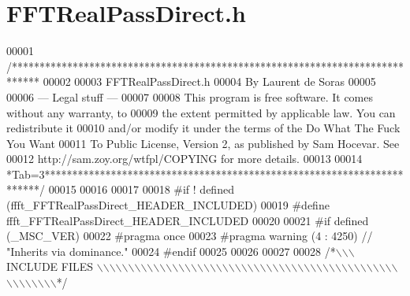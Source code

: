 \hypertarget{a00100_source}{\section{F\+F\+T\+Real\+Pass\+Direct.\+h}
\label{a00100_source}
}

\begin{DoxyCode}
00001 \textcolor{comment}{/*****************************************************************************}
00002 \textcolor{comment}{}
00003 \textcolor{comment}{        FFTRealPassDirect.h}
00004 \textcolor{comment}{        By Laurent de Soras}
00005 \textcolor{comment}{}
00006 \textcolor{comment}{--- Legal stuff ---}
00007 \textcolor{comment}{}
00008 \textcolor{comment}{This program is free software. It comes without any warranty, to}
00009 \textcolor{comment}{the extent permitted by applicable law. You can redistribute it}
00010 \textcolor{comment}{and/or modify it under the terms of the Do What The Fuck You Want}
00011 \textcolor{comment}{To Public License, Version 2, as published by Sam Hocevar. See}
00012 \textcolor{comment}{http://sam.zoy.org/wtfpl/COPYING for more details.}
00013 \textcolor{comment}{}
00014 \textcolor{comment}{*Tab=3***********************************************************************/}
00015 
00016 
00017 
00018 \textcolor{preprocessor}{#if ! defined (ffft\_FFTRealPassDirect\_HEADER\_INCLUDED)}
00019 \textcolor{preprocessor}{#define ffft\_FFTRealPassDirect\_HEADER\_INCLUDED}
00020 
00021 \textcolor{preprocessor}{#if defined (\_MSC\_VER)}
00022 \textcolor{preprocessor}{    #pragma once}
00023 \textcolor{preprocessor}{    #pragma warning (4 : 4250) // "Inherits via dominance."}
00024 \textcolor{preprocessor}{#endif}
00025 
00026 
00027 
00028 \textcolor{comment}{/*\(\backslash\)\(\backslash\)\(\backslash\) INCLUDE FILES \(\backslash\)\(\backslash\)\(\backslash\)\(\backslash\)\(\backslash\)\(\backslash\)\(\backslash\)\(\backslash\)\(\backslash\)\(\backslash\)\(\backslash\)\(\backslash\)\(\backslash\)\(\backslash\)\(\backslash\)\(\backslash\)\(\backslash\)\(\backslash\)\(\backslash\)\(\backslash\)\(\backslash\)\(\backslash\)\(\backslash\)\(\backslash\)\(\backslash\)\(\backslash\)\(\backslash\)\(\backslash\)\(\backslash\)\(\backslash\)\(\backslash\)\(\backslash\)\(\backslash\)\(\backslash\)\(\backslash\)\(\backslash\)\(\backslash\)\(\backslash\)\(\backslash\)\(\backslash\)\(\backslash\)\(\backslash\)\(\backslash\)\(\backslash\)\(\backslash\)\(\backslash\)\(\backslash\)\(\backslash\)\(\backslash\)\(\backslash\)\(\backslash\)\(\backslash\)\(\backslash\)\(\backslash\)\(\backslash\)\(\backslash\)*/}

\end{DoxyCode}
